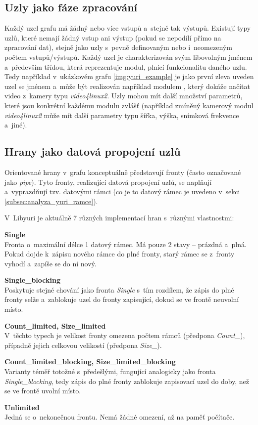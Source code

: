 \documentclass[thesis=M,czech]{FITthesis}[2012/06/26]
\begin{document}
\subsection{Uzly jako fáze zpracování} \label{subsec:analyza_yuri_uzly}
Každý uzel grafu má žádný nebo více vstupů a~stejně tak výstupů. Existují typy uzlů, které nemají žádný vstup ani výstup (pokud se nepodílí přímo na zpracování dat), stejně jako uzly s~pevně definovaným nebo i~neomezeným počtem vstupů/výstupů. Každý uzel je charakterizován svým libovolným jménem a~především třídou, která reprezentuje modul, plnící funkcionalitu daného uzlu. Tedy například v~ukázkovém grafu \ref{img:yuri_example} je jako první zleva uveden uzel se jménem  a~může být realizován například modulem , který dokáže načítat video z~kamery typu \textit{video4linux2}. Uzly mohou mít další množství parametrů, které jsou konkrétní každému modulu zvlášť (například zmíněný kamerový modul \textit{video4linux2} může mít další parametry typu šířka, výška, snímková frekvence a~jiné).

\subsection{Hrany jako datová propojení uzlů} \label{subsec:analyza_yuri_hrany}
Orientované hrany v~grafu konceptuálně představují fronty (často označované jako \textit{pipe}). Tyto fronty, realizující datová propojení uzlů, se naplňují a~vyprazdňují tzv. datovými rámci (co je to datový rámec je uvedeno v~sekci \ref{subsec:analyza_yuri_ramce}).

V~Libyuri je aktuálně 7 různých implementací hran s~různými vlastnostmi:
\begin{description}
  \item \textbf{Single\\}
Fronta o~maximální délce 1 datový rámec. Má pouze 2 stavy -- prázdná a~plná. Pokud dojde k~zápisu nového rámce do plné fronty, starý rámec se z~fronty vyhodí a~zapíše se do ní nový.
  \item \textbf{Single\_blocking\\}
 Poskytuje stejné chování jako fronta \textit{Single} s~tím rozdílem, že zápis do plné fronty selže a~zablokuje uzel do fronty zapisující, dokud se ve frontě neuvolní místo.
  \item \textbf{Count\_limited, Size\_limited\\}
 V~těchto typech je velikost fronty omezena počtem rámců (předpona \textit{Count\_}), případně jejich celkovou velikostí (předpona \textit{Size\_}).
  \item \textbf{Count\_limited\_blocking, Size\_limited\_blocking\\}
  Varianty téměř totožné s~předešlými, fungující analogicky jako fronta \textit{Single\_blocking}, tedy zápis do plné fronty zablokuje zapisovací uzel do doby, než se ve frontě uvolní místo.
  \item \textbf{Unlimited\\}
Jedná se o~nekonečnou frontu. Nemá žádné omezení, až na paměť počítače.
\end{description}
\end{document}

